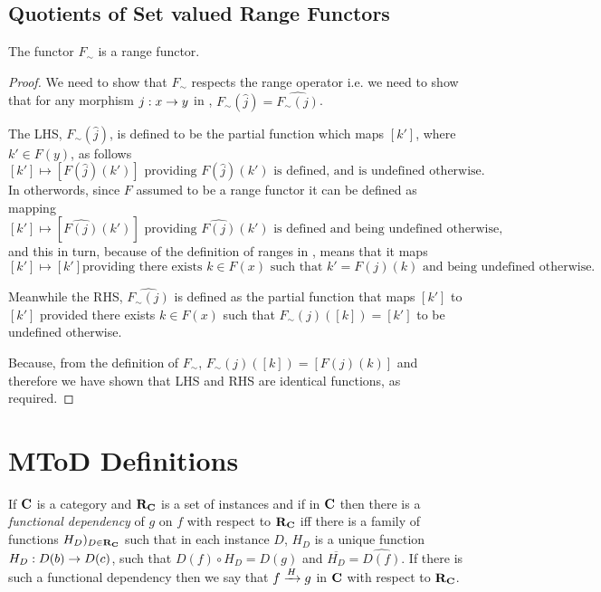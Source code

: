 \documentclass[10pt,a4paper]{article}
\theoremstyle{remark}
\renewcommand{\term}[1]{\textit{#1}}  %
\begin{document}
\subsection{Quotients of Set valued Range Functors}
\begin{lemma}
The functor $F_\sim$ is a range functor.
\end{lemma}
\begin{proof}
We need to show that  $F_\sim$ respects the range operator
i.e. we need to show that
 for any morphism $j:x \morph y$ in \catcw, $F_\sim(\hat{j})= \widehat{F_\sim(j)}$.

The LHS, $F_\sim(\hat{j})$, is defined to  be 
the partial function which maps $[k']$, where $k' \in F(y)$, as follows
$$ [k'] \mapsto [F(\hat{j})(k')] \mbox{ providing $F(\hat{j})(k')$ is defined, and is undefined otherwise.}$$
In otherwords, since  $F$ assumed to be a range functor it can be defined as mapping
$$ [k'] \mapsto [\widehat{F(j)}(k')] \mbox{ providing $\widehat{F(j)}(k')$ is defined and being undefined otherwise,}$$
and this in turn, because of the definition of ranges in \SetP, means that it maps
$$ [k'] \mapsto [k'] \mbox{providing there exists $k \in F(x)$ such that $k'=F(j)(k)$ and being undefined otherwise.}$$

Meanwhile the RHS, $\widehat{F_\sim(j)}$  is defined as the partial function that 
maps $[k']$  to $[k']$  provided  there exists $k \in F(x)$ such that
$F_\sim(j)([k])=[k']$ to be undefined otherwise.

Because,
from the definition of $F_\sim$, $F_\sim(j)([k])= [F(j)(k)]$ and therefore 
we have shown that LHS and RHS are identical functions, as required.
\end{proof}
\newpage

\section{MToD Definitions}

\begin{definition}
If $\catc$ is a category and $\reqtc$ is a set of instances and if \fgsourcediag
in $\catc$ then there is a  \term{functional dependency} of $g$ on $f$ with respect to $\reqtc$ iff
there is a family of functions $H_D)_{D \in \reqtc}$ such that 
in each instance $D$, $H_D$ is a unique function $H_D: D(b) \morph D(c)$, such that $D(f) \circ H_D = D(g)$ and $\overline{H_D}=\widehat{D(f)}$.
If there is such a functional dependency then we say that $\fundep{H}{f}{g}$ in $\catc$ with respect to $\reqtc$.
\end{definition}
\end{document}
